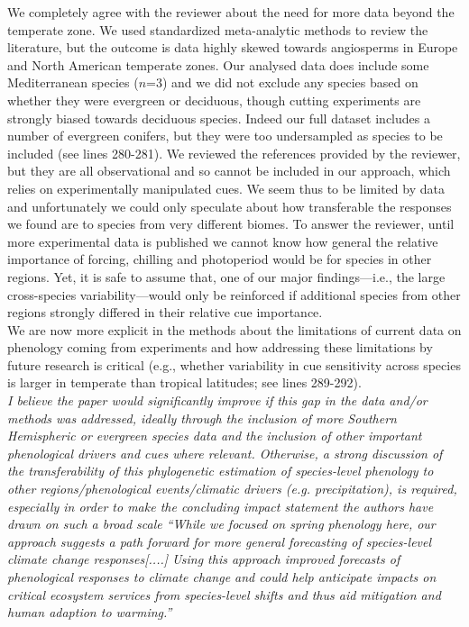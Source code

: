 \documentclass[11pt]{article}
\begin{document}
We completely agree with the reviewer about the need for more data beyond the temperate zone. We used standardized meta-analytic methods to review the literature, but the outcome is data highly skewed towards angiosperms in Europe and North American temperate zones. Our analysed data does include some Mediterranean species ($n$=3) and we did not exclude any species based on whether they were evergreen or deciduous, though cutting experiments are strongly biased towards deciduous species. Indeed our full dataset includes a number of evergreen conifers, but they were too undersampled as species to be included (see lines 280-281). We reviewed the references provided by the reviewer, but they are all observational and so cannot be included in our approach, which relies on experimentally manipulated cues. We seem thus to be limited by data and unfortunately we could only speculate about how transferable the responses we found are to species from very different biomes. To answer the reviewer, until more experimental data is published we cannot know how general the relative importance of forcing, chilling and photoperiod would be for species in other regions. Yet, it is safe to assume that, one of our major findings---i.e., the large cross-species variability---would only be reinforced if additional species from other regions strongly differed in their relative cue importance.\\

We are now more explicit in the methods about the limitations of current data on phenology coming from experiments and how addressing these limitations by future research is critical (e.g., whether variability in cue sensitivity across species is larger in temperate than tropical latitudes; see lines 289-292). \\


\emph{I believe the paper would significantly improve if this gap in the data and/or methods was addressed, ideally through the inclusion of more Southern Hemispheric or evergreen species data and the inclusion of other important phenological drivers and cues where relevant. Otherwise, a strong discussion of the transferability of this phylogenetic estimation of species-level phenology to other regions/phenological events/climatic drivers (e.g. precipitation), is required, especially in order to make the concluding impact statement the authors have drawn on such a broad scale “While we focused on spring phenology here, our approach suggests a path forward for more general forecasting of species-level climate change responses[....] Using this approach improved forecasts of phenological responses to climate change and could help anticipate impacts on critical ecosystem services from species-level shifts and thus aid mitigation and human adaption to warming.”}\\
\end{document}
